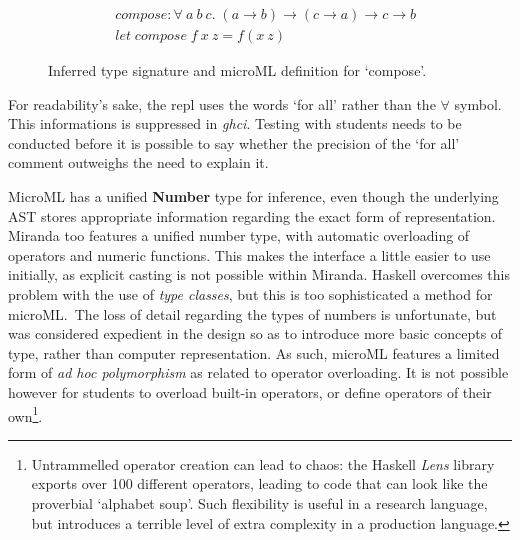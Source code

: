 \documentclass[12pt, a4paper]{report}
\begin{document}
\begin{figure}
        \begin{align*}
            &compose : \forall\:a\:b\:c.\;(a \rightarrow b) \rightarrow (c \rightarrow a) \rightarrow c \rightarrow b \\
            &let\;compose\;f\:x\: z = f (x\:z)
        \end{align*}
    \caption{Inferred type signature and microML definition for `compose'.}
    \label{fig:typesig}
\end{figure}

For readability's sake, the repl uses the words `for all' rather than the $\forall$ symbol. This
informations is suppressed in \textit{ghci}. Testing with students needs to be conducted before it
is possible to say whether the precision of the `for all' comment outweighs the need to explain it.

MicroML has a unified \textbf{Number} type for inference, even though the underlying AST stores
appropriate information regarding the exact form of representation. Miranda too features a unified
number type, with automatic overloading of operators and numeric functions. This makes the interface
a little easier to use initially, as explicit casting is not possible within Miranda. Haskell
overcomes this problem with the use of \textit{type classes}, but this is too sophisticated a
method for microML.\ The loss of detail regarding the types of numbers is unfortunate, but was
considered expedient in the design so as to introduce more basic concepts of type, rather than
computer representation. As such, microML features a limited form of \textit{ad hoc polymorphism}
as related to operator overloading. It is not possible however for students to overload built-in
operators, or define operators of their own\footnote{Untrammelled operator creation can lead to
chaos: the Haskell \textit{Lens} library exports over 100 different operators, leading to code that
can look like the proverbial `alphabet soup'. Such flexibility is useful in a research language, but
introduces a terrible level of extra complexity in a production language.}.
\end{document}
